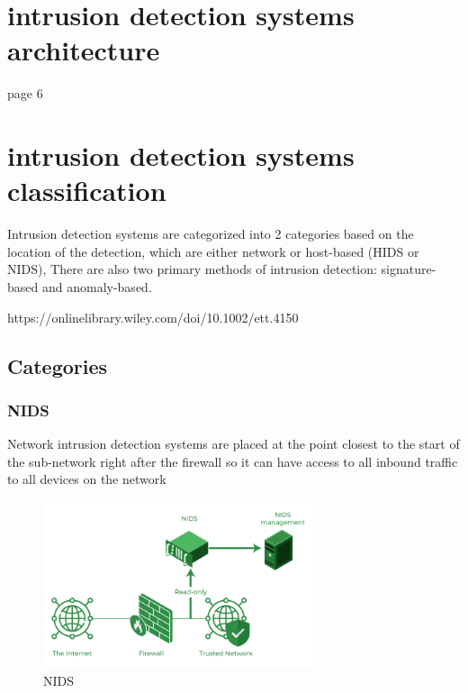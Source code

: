 \section{intrusion detection systems architecture}
page 6

\section{intrusion detection systems classification}

Intrusion detection systems are categorized into 2 categories based on the location of the detection, which are either network or host-based (HIDS or NIDS), There are also two primary methods of intrusion detection: signature-based and anomaly-based. \cite{2}

https://onlinelibrary.wiley.com/doi/10.1002/ett.4150


\subsection{Categories}






\subsubsection{NIDS}
Network intrusion detection systems are placed at the point closest to the start of the sub-network right after the firewall so it can have access to all inbound traffic to all devices on the network 



\begin{figure}[h]
	\centering
	\includegraphics[width=300px]{figures/NIDS.png}
	\caption{NIDS \cite{HIDS-and-NIDS-geeksforgeeks}}
	\label{fig:NIDS}
\end{figure}




